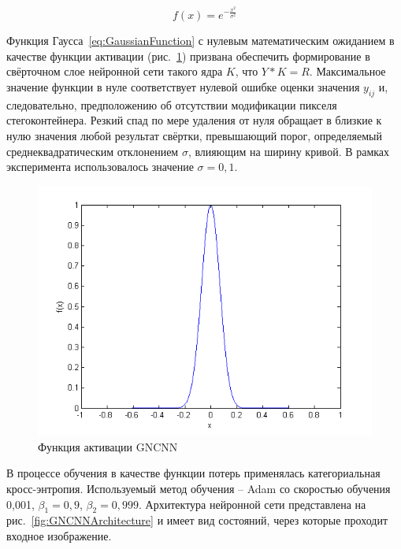 \begin{equation}
\label{eq:GaussianFunction}
f(x) = e^{-\frac{x^2}{\sigma^2}}
\end{equation}

Функция Гаусса~\eqref{eq:GaussianFunction} с нулевым математическим ожиданием в качестве функции активации (рис.~\ref{fig:GaussianFunction}) призвана обеспечить формирование в свёрточном слое нейронной сети такого ядра $ K $, что $ Y*K = R $. Максимальное значение функции в нуле соответствует нулевой ошибке оценки значения $ y_{ij} $ и, следовательно, предположению об отсутствии модификации пикселя стегоконтейнера. Резкий спад по мере удаления от нуля обращает в близкие к нулю значения любой результат свёртки, превышающий порог, определяемый среднеквадратическим отклонением $ \sigma $, влияющим на ширину кривой. В рамках эксперимента использовалось значение $ \sigma = 0,1 $.

\begin{figure}
\centering
\includegraphics[width=1\textwidth]{include/graphics/im_2-gaussian_function}
\caption{Функция активации GNCNN}
\label{fig:GaussianFunction}
\end{figure}

В процессе обучения в качестве функции потерь применялась категориальная кросс-энтропия. Используемый метод обучения – Adam со скоростью обучения 0,001, $ \beta_1 = 0,9 $, $ \beta_2 = 0,999 $. Архитектура нейронной сети представлена на рис.~\ref{fig:GNCNNArchitecture} и имеет вид состояний, через которые проходит входное изображение.

